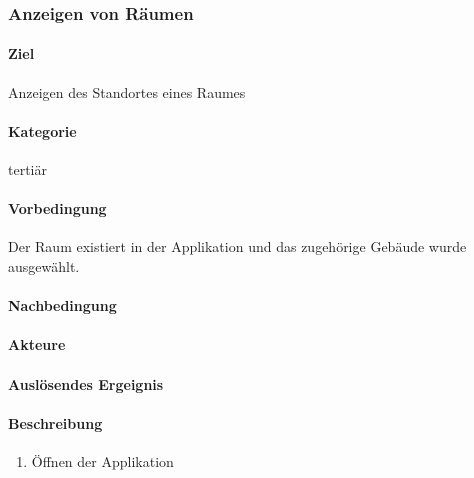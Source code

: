 \subsubsection{Anzeigen von Räumen}
\label{Anzeigen von Räumen}
\paragraph{Ziel}
Anzeigen des Standortes eines Raumes
\paragraph{Kategorie}
tertiär
\paragraph{Vorbedingung}
Der Raum existiert in der Applikation und das zugehörige Gebäude wurde ausgewählt.
\paragraph{Nachbedingung}

\paragraph{Akteure}

\paragraph{Auslösendes Ergeignis}

\paragraph{Beschreibung}
\begin{enumerate}
    \item Öffnen der Applikation
\end{enumerate}